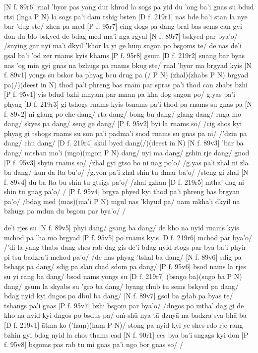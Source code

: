 \documentclass[naipra.tex]{subfiles}
\begin{document}
[N f. 89r6] rnal 'byor pas yang dur khrod la sogs pa yid du 'ong ba'i gnas su bdud rtsi (lnga P N) la sogs pa'i dam tshig bsten [D f. 219r1] nas bde ba'i stan la nye bar 'dug ste/ zhen pa med [P f. 95r7] cing dogs pa dang bral bas sems can gyi don du blo bskyed de bdag med ma'i nga rgyal [N f. 89r7] bskyed par bya'o/ /snying gar nyi ma'i dkyil 'khor la yi ge hūṃ sngon po bsgoms te/ de nas de'i gsal ba'i 'od zer rnams kyis khams [P f. 95r8] gsum [D f. 219r2] snang bar byas nas 'og min gyi gnas na bzhugs pa rnams bkug ste/ rnal 'byor ma brgyad kyis [N f. 89v1] yongs su bskor ba phyag bcu drug pa (/ P N) (zhal)(zhabs P N) brgyad pa(/)(deest in N) thod pa'i phreng bas rnam par spras pa'i thod can zhabs bzhi [P f. 95v1] yis bdud bzhi mnyam par mnan pa kha dog sngon po/ g.yas pa'i phyag [D f. 219r3] gi tshogs rnams kyis bsnams pa'i thod pa rnams su gnas pa [N f. 89v2] ni glang po che dang/ rta dang/ bong bu dang/ glang dang/ rnga mo dang/ skyes pa dang/ seng ge dang/ [P f. 95v2] byi la rnams so/ /cig shos kyi phyag gi tshogs rnams su son pa'i padma'i snod rnams su gnas pa ni/ /'dzin pa dang/ chu dang/ [D f. 219r4] skul byed dang(/)(deest in N) [N f. 89v3] ’bar ba dang/ mtshan mo'i (mgo)(mgon P N) dang/ nyi ma dang/ gshin rje dang/ gnod [P f. 95v3] sbyin rnams so/ /zhal gyi gtso bo ni nag po'o/ /g.yas pa'i zhal ni zla ba dang/ kun da lta bu'o/ /g.yon pa'i zhal shin tu dmar ba'o/ /steng gi zhal [N f. 89v4] du ba lta bu shin tu gtsigs pa'o/ /zhal gzhan [D f. 219r5] mtha' dag ni shin tu gnag pa'o/ / [P f. 95v4] brgya phyed kyi thod pa'i phreng bas brgyan pa'o/ /bdag med (mas)(ma'i P N) mgul nas 'khyud pa/ nam mkha'i dkyil na bzhugs pa mdun du bsgom par bya'o/ /

de'i rjes su [N f. 89v5] phyi dang/ gsang ba dang/ de kho na nyid rnams kyis mchod pa lha mo brgyad [P f. 95v5] po rnams kyis [D f. 219r6] mchod par bya'o/ /'di la yang thabs dang shes rab dag gis de'i bdag nyid rtogs par bya ba'i phyir pi tsu badzra'i mchod pa'o/ /de nas phyag 'tshal ba dang/ [N f. 89v6] sdig pa bshags pa dang/ sdig pa slan chad sdom pa dang/ [P f. 95v6] bsod nams la rjes su yi rang ba dang/ bsod nams yongs su [D f. 219r7] (bsngo ba)(sngo ba P N) dang/ gsum la skyabs su 'gro ba dang/ byang chub tu sems bskyed pa dang/ bdag nyid kyi dngos po dbul ba dang/ [N f. 89v7] gsol ba gdab pa byas te/ tshangs pa'i gnas [P f. 95v7] bzhi bsgom par bya'o/ /dngos po mtha' dag gi de kho na nyid kyi dngos po bsdus pa/ oṁ shū nya tā dznyā na badzra sva bhā ba [D f. 219v1] ātma ko ('haṃ)(haṃ P N)/ stong pa nyid kyi ye shes rdo rje rang bzhin gyi bdag nyid la chos thams cad [N f. 90r1] ces bya ba'i sngags kyi don [P f. 95v8] bsgoms pas rab tu mi gnas pa'i ngo bor gnas so/ /
\end{document}
